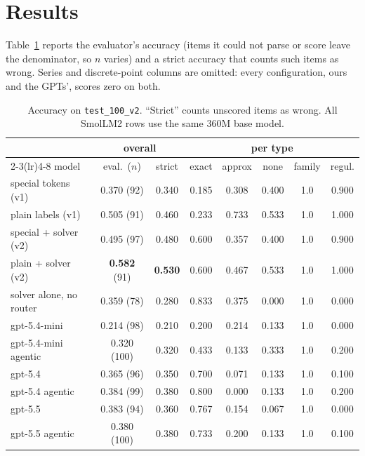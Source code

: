 \documentclass[11pt]{article}
\begin{document}
\section{Results}
Table~\ref{tab:results} reports the evaluator's accuracy (items it could not
parse or score leave the denominator, so $n$ varies) and a strict accuracy
that counts such items as wrong. Series and discrete-point columns are
omitted: every configuration, ours and the GPTs', scores zero on both.

\begin{table}[h]
\centering
\small
\begin{tabular}{lccccccc}
\toprule
 & \multicolumn{2}{c}{overall} & \multicolumn{5}{c}{per type} \\
\cmidrule(lr){2-3}\cmidrule(lr){4-8}
model & eval.\ ($n$) & strict & exact & approx & none & family & regul. \\
\midrule
special tokens (v1)        & 0.370 (92)  & 0.340 & 0.185 & 0.308 & 0.400 & 1.0 & 0.900 \\
plain labels (v1)          & 0.505 (91)  & 0.460 & 0.233 & 0.733 & 0.533 & 1.0 & 1.000 \\
special + solver (v2)      & 0.495 (97)  & 0.480 & 0.600 & 0.357 & 0.400 & 1.0 & 0.900 \\
plain + solver (v2)        & \textbf{0.582} (91) & \textbf{0.530} & 0.600 & 0.467 & 0.533 & 1.0 & 1.000 \\
solver alone, no router    & 0.359 (78)  & 0.280 & 0.833 & 0.375 & 0.000 & 1.0 & 0.000 \\
\midrule
gpt-5.4-mini               & 0.214 (98)  & 0.210 & 0.200 & 0.214 & 0.133 & 1.0 & 0.000 \\
gpt-5.4-mini agentic       & 0.320 (100) & 0.320 & 0.433 & 0.133 & 0.333 & 1.0 & 0.200 \\
gpt-5.4                    & 0.365 (96)  & 0.350 & 0.700 & 0.071 & 0.133 & 1.0 & 0.100 \\
gpt-5.4 agentic            & 0.384 (99)  & 0.380 & 0.800 & 0.000 & 0.133 & 1.0 & 0.200 \\
gpt-5.5                    & 0.383 (94)  & 0.360 & 0.767 & 0.154 & 0.067 & 1.0 & 0.000 \\
gpt-5.5 agentic            & 0.380 (100) & 0.380 & 0.733 & 0.200 & 0.133 & 1.0 & 0.100 \\
\bottomrule
\end{tabular}
\caption{Accuracy on \texttt{test\_100\_v2}. ``Strict'' counts unscored items
as wrong. All SmolLM2 rows use the same 360M base model.}
\label{tab:results}
\end{table}
\end{document}
